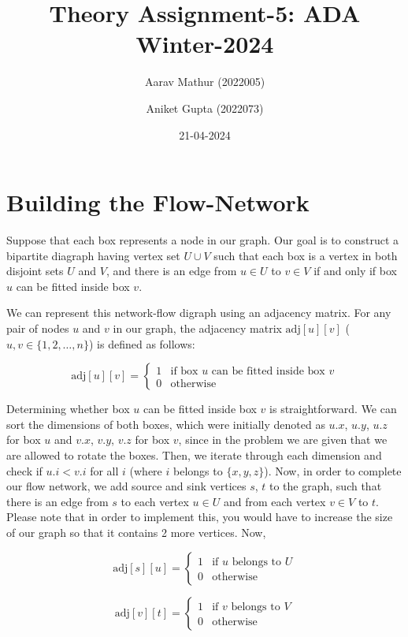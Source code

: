 \documentclass{article}
\title{Theory Assignment-5: ADA Winter-2024}
\author{Aarav Mathur (2022005) \and Aniket Gupta (2022073)}
\date{21-04-2024}
\begin{document}
\maketitle

\section{Building the Flow-Network}
Suppose that each box represents a node in our graph. Our goal is to construct a bipartite diagraph having vertex set $U \cup V$ such that each box is a vertex in both disjoint sets $U$ and $V$, and there is an edge from $u \in U$ to $v \in V$ if and only if box $u$ can be fitted inside box $v$.

\noindent We can represent this network-flow digraph using an adjacency matrix. For any pair of nodes $u$ and $v$ in our graph, the adjacency matrix $\text{adj}[u][v]$ ($u, v \in \{1, 2, \dots, n\}$) is defined as follows:

\[
\text{adj}[u][v] =
\begin{cases}
1 & \text{if box } u \text{ can be fitted inside box } v \\
0 & \text{otherwise}
\end{cases}
\]

\noindent Determining whether box $u$ can be fitted inside box $v$ is straightforward. We can sort the dimensions of both boxes, which were initially denoted as $u.x$, $u.y$, $u.z$ for box $u$ and $v.x$, $v.y$, $v.z$ for box $v$, since in the problem we are given that we are allowed to rotate the boxes. Then, we iterate through each dimension and check if $u.i < v.i$ for all $i$ (where $i$ belongs to $\{x, y, z\}$). Now, in order to complete our flow network, we add source and sink vertices $s$, $t$ to the graph, such that there is an edge from $s$ to each vertex $u \in U$ and from each vertex $v \in V$ to $t$. Please note that in order to implement this, you would have to increase the size of our graph so that it contains 2 more vertices. Now,

\[
\text{adj}[s][u] =
\begin{cases}
1 & \text{if } u \text{ belongs to } U \\
0 & \text{otherwise}
\end{cases}
\]

\[
\text{adj}[v][t] =
\begin{cases}
1 & \text{if } v \text{ belongs to } V \\
0 & \text{otherwise}
\end{cases}
\]
\end{document}

